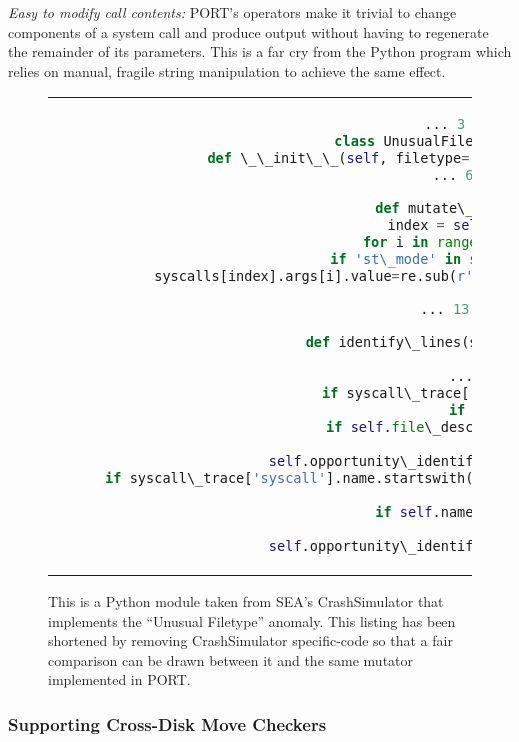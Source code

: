 \textit{Easy to modify call contents:}  PORT's operators make it
trivial to change components of a system call
and produce output without having to regenerate the remainder of its
parameters.
This is a far cry
from the Python program which relies on manual, fragile string manipulation
to achieve the same effect.


\begin{figure}[H]
\centering
\begin{tabular}{c}
\begin{lstlisting}[language=python]
... 3 lines omitted ...
class UnusualFiletypeMutator(GenericMutator):
  def \_\_init\_\_(self, filetype='S\_IFREG', name=None, file\_descriptor=None):
  ... 6 lines omitted ...

  def mutate\_syscalls(self, syscalls):
    index = self.\_find\_index(syscalls)
    for i in range(len(syscalls[index].args)):
      if 'st\_mode' in str(syscalls[index].args[i].value):
        syscalls[index].args[i].value=re.sub(r'S\_IF(\w*)', self.filetype, syscalls[index].args[i].value)

... 13 lines omitted ...

  def identify\_lines(self, tm, que, thread\_condition):
    while True:
      ... 3 lines omitted ...
      if syscall\_trace['syscall'].name.startswith('fstat'):
        if self.file\_descriptor:
          if self.file\_descriptor != syscall\_trace.args[0].value:
            continue
        self.opportunity\_identified(syscall\_trace, self.mutator\_name, que)
      if syscall\_trace['syscall'].name.startswith('stat') or syscall\_trace['syscall'].name.startswith('lstat'):
        if self.name:
          if self.name != syscall\_trace.args[0].value:
            continue
        self.opportunity\_identified(syscall\_trace, self.mutator\_name, que)
\end{lstlisting}
\end{tabular}
\caption{This is a Python module taken from SEA's CrashSimulator that
  implements the ``Unusual Filetype'' anomaly.  This listing has been
  shortened by removing CrashSimulator specific-code so that a fair
  comparison can be drawn between it and the same mutator implemented in
  PORT.}
\label{lst:UnusualFiletypePython}
\end{figure}

\subsubsection{Supporting Cross-Disk Move Checkers}

